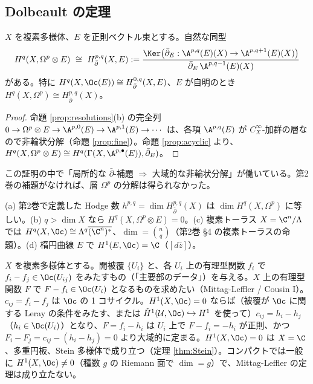 \subsection{Dolbeault の定理}
\begin{thm}[Dolbeault]\label{thm:Dolbeault}\tP
$X$ を複素多様体、$E$ を正則ベクトル束とする。自然な同型
\[
H^q(X,\Omega^p\otimes E)\ \cong\ H^{p,q}_{\bar\partial}(X,E):=\frac{\Ker\big(\bar\partial_E:\A^{p,q}(E)(X)\to\A^{p,q+1}(E)(X)\big)}{\bar\partial_E\,\A^{p,q-1}(E)(X)}
\]
がある。特に $H^q(X,\Oc(E))\cong H^{0,q}_{\bar\partial}(X,E)$、$E$ が自明のとき $H^q(X,\Omega^p)\cong H^{p,q}_{\bar\partial}(X)$。
\end{thm}
\begin{proof}
命題 \ref{prop:resolutions}(b) の完全列 $0\to\Omega^p\otimes E\to\A^{p,0}(E)\to\A^{p,1}(E)\to\cdots$ は、各項 $\A^{p,q}(E)$ が $C^\infty_X$-加群の層なので非輪状分解（命題 \ref{prop:fine}）。命題 \ref{prop:acyclic} より、$H^q(X,\Omega^p\otimes E)\cong H^q(\Gamma(X,\A^{p,\bullet}(E)),\bar\partial_E)$。\qedhere
\end{proof}
この証明の中で「局所的な $\bar\partial$-補題 $\Rightarrow$ 大域的な非輪状分解」が働いている。第2巻の補題がなければ、層 $\Omega^p$ の分解は得られなかった。
\begin{cor}\label{cor:Hodgenumbers}
(a) 第2巻で定義した Hodge 数 $h^{p,q}=\dim H^{p,q}_{\bar\partial}(X)$ は $\dim H^q(X,\Omega^p)$ に等しい。(b) $q>\dim X$ なら $H^q(X,\Omega^p\otimes E)=0$。(c) 複素トーラス $X=\C^n/\Lambda$ では $H^q(X,\Oc)\cong\Lambda^q\overline{(\C^n)^*}$、$\dim=\binom nq$（第2巻 §4 の複素トーラスの命題）。(d) 楕円曲線 $E$ で $H^1(E,\Oc)=\C$（$[d\bar z]$）。
\end{cor}
\begin{ex}\label{ex:cousin}
$X$ を複素多様体とする。開被覆 $\{U_i\}$ と、各 $U_i$ 上の有理型関数 $f_i$ で $f_i-f_j\in\Oc(U_{ij})$ をみたすもの（「主要部のデータ」）を与える。$X$ 上の有理型関数 $F$ で $F-f_i\in\Oc(U_i)$ となるものを求めたい（Mittag-Leffler / Cousin I）。$c_{ij}=f_i-f_j$ は $\Oc$ の 1 コサイクル。$H^1(X,\Oc)=0$ ならば（被覆が $\Oc$ に関する Leray の条件をみたす、または $\check H^1(\mathcal U,\Oc)\hookrightarrow H^1$ を使って）$c_{ij}=h_i-h_j$（$h_i\in\Oc(U_i)$）となり、$F=f_i-h_i$ は $U_i$ 上で $F-f_i=-h_i$ が正則、かつ $F_i-F_j=c_{ij}-(h_i-h_j)=0$ より大域的に定まる。$H^1(X,\Oc)=0$ は $X=\C$、多重円板、Stein 多様体で成り立つ（定理 \ref{thm:Stein}）。コンパクトでは一般に $H^1(X,\Oc)\ne0$（種数 $g$ の Riemann 面で $\dim=g$）で、Mittag-Leffler の定理は成り立たない。
\end{ex}

